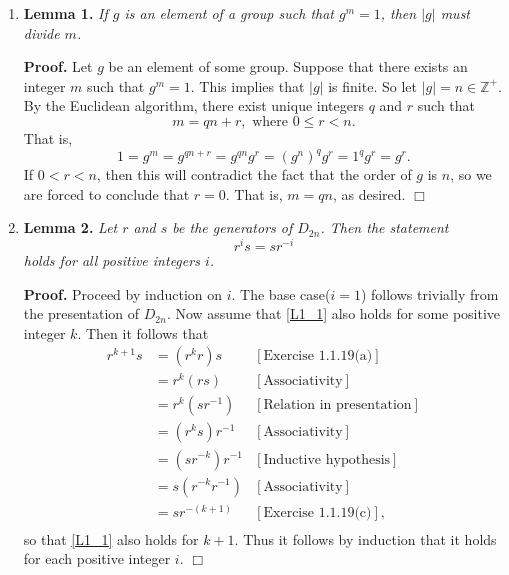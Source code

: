 \documentclass[9pt]{article}
\newcommand{\qed}{\hfill \ensuremath{\Box}}
\newcommand{\Z}{\mathbb{Z}}
\begin{document}
\begin{enumerate}
   \item[]        \textbf{Lemma 1.} \textit{If $g$ is an element of a group
                  such that $g^m = 1$, then $|g|$ must divide $m$.}

                  \textbf{Proof.} Let $g$ be an element of some group. Suppose
                  that there exists an integer $m$ such that $g^m = 1$. This
                  implies that $|g|$ is finite. So let $|g| = n \in \Z^+$. By
                  the Euclidean algorithm, there exist unique integers $q$ and
                  $r$ such that
                  $$m = qn + r, \text{ where } 0 \le r < n.$$
                  That is,
                  $$1 = g^m = g^{qn + r} = g^{qn}g^r = (g^n)^qg^r =1^qg^r=g^r.$$
                  If $0 < r < n$, then this will contradict the fact that the
                  order of $g$ is $n$, so we are forced to conclude that
                  $r = 0$. That is, $m = qn$, as desired. \qed
   \item[]        \textbf{Lemma 2.} \textit{Let $r$ and $s$ be the generators of
                  $D_{2n}$. Then the statement}
                  \begin{equation} \label{L1_1}
                     r^is = sr^{-i}
                  \end{equation}
                  \textit{holds for all positive integers $i$.}

                  \textbf{Proof.} Proceed by induction on $i$. The base
                  case($i = 1$) follows trivially from the presentation of
                  $D_{2n}$. Now assume that \eqref{L1_1} also holds for some
                  positive integer $k$. Then it follows that
                  \begin{align*}
                     r^{k+1}s &= (r^kr)s &[\text{Exercise 1.1.19(a)}] \\
                        &= r^k(rs) &[\text{Associativity}] \\
                        &= r^k(sr^{-1}) &[\text{Relation in presentation}] \\
                        &= (r^ks)r^{-1} &[\text{Associativity}] \\
                        &= (sr^{-k})r^{-1} &[\text{Inductive hypothesis}] \\
                        &= s(r^{-k}r^{-1}) &[\text{Associativity}] \\
                        &= sr^{-(k+1)} &[\text{Exercise 1.1.19(c)}], \\
                  \end{align*}
                  so that \eqref{L1_1} also holds for $k+1$. Thus it follows by
                  induction that it holds for each positive integer $i$. \qed


\end{enumerate}
\end{document}
